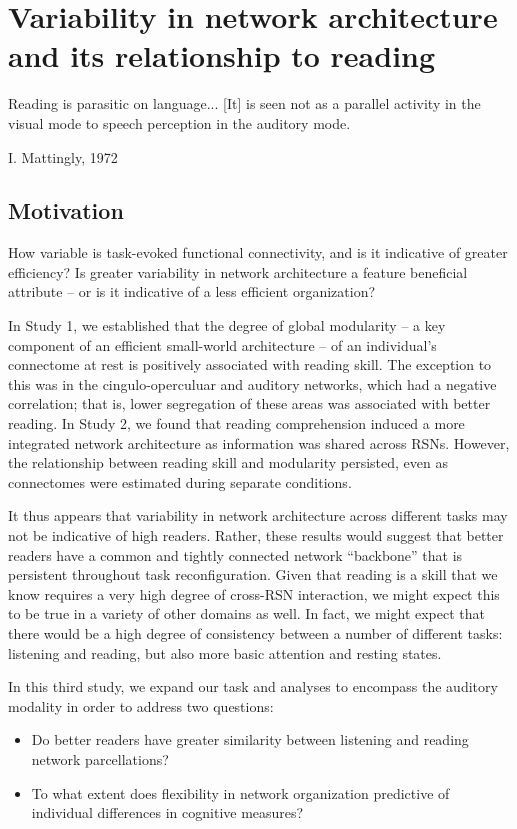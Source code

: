 \chapter{Variability in network architecture and its relationship to reading}

\epigraph{Reading is parasitic on language... [It] is seen not as a parallel activity in the visual mode to speech perception in the auditory mode.}{I. Mattingly, 1972 \citep{Mattingly1971}}

\section{Motivation}

How variable is task-evoked functional connectivity, and is it indicative of greater efficiency? Is greater variability in network architecture a feature beneficial attribute -- or is it indicative of a less efficient organization?

In Study 1, we established that the degree of global modularity -- a key component of an efficient small-world architecture -- of an individual's connectome at rest is positively associated with reading skill. The exception to this was in the cingulo-operculuar and auditory networks, which had a negative correlation; that is, lower segregation of these areas was associated with better reading. In Study 2, we found that reading comprehension induced a more integrated network architecture as information was shared across RSNs. However, the relationship between reading skill and modularity persisted, even as connectomes were estimated during separate conditions. 

It thus appears that variability in network architecture across different tasks may not be indicative of high readers. Rather, these results would suggest that better readers have a common and tightly connected network ``backbone'' that is persistent throughout task reconfiguration. Given that reading is a skill that we know requires a very high degree of cross-RSN interaction, we might expect this to be true in a variety of other domains as well. In fact, we might expect that there would be a high degree of consistency between a number of different tasks: listening and reading, but also more basic attention and resting states. 

In this third study, we expand our task and analyses to encompass the auditory modality in order to address two questions:

\begin{itemize} 
	\item Do better readers have greater similarity between listening and reading network parcellations?
	\item To what extent does flexibility in network organization predictive of individual differences in cognitive measures?
\end{itemize} 

